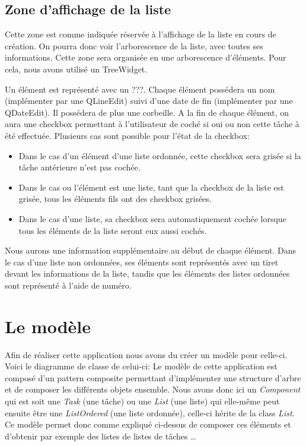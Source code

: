 \documentclass[a4paper,10pt]{article}
\begin{document}
\subsection{Zone d'affichage de la liste}
Cette zone est comme indiquée réservée à l'affichage de la liste en cours de création. On pourra donc voir l'arborescence de la liste, avec toutes ses informations.
Cette zone sera organisée en une arborescence d'éléments. Pour cela, nous avons utilisé un TreeWidget.

Un élément est représenté avec un ???. %
Chaque élément possédera un nom (implémenter par une QLineEdit) suivi d'une date de fin (implémenter par une QDateEdit). Il possédera de plus une corbeille. A la fin de chaque élément, on aura une checkbox permettant à l'utilisateur de coché si oui ou non cette tâche à été effectuée. Plusieurs cas sont possible pour l'état de la checkbox:
\begin{itemize}
\item Dans le cas d'un élément d'une liste ordonnée, cette checkbox sera grisée si la tâche antérieure n'est pas cochée.
\item Dans le cas ou l'élément est une liste, tant que la checkbox de la liste est grisée, tous les éléments fils ont des checkbox grisées.
\item Dans le cas d'une liste, sa checkbox sera automatiquement cochée lorsque tous les éléments de la liste seront eux aussi cochés.
\end{itemize}
Nous aurons une information supplémentaire au début de chaque élément. Dans le cas d'une liste non ordonnées, ses éléments sont représentés avec un tiret devant les informations de la liste, tandis que les éléments des listes ordonnées sont représenté à l'aide de numéro.

\newpage
\section{Le modèle}
Afin de réaliser cette application nous avons du créer un modèle pour celle-ci. Voici le diagramme de classe de celui-ci:
Le modèle de cette application est composé d'un pattern composite permettant d'implémenter une structure d'arbre et de composer les différents objets ensemble. Nous avons donc ici un \textit{Component} qui est soit une \textit{Task} (une tâche) ou une \textit{List} (une liste) qui elle-même peut ensuite être une \textit{ListOrdered} (une liste ordonnée), celle-ci hérite de la class \textit{List}. Ce modèle permet donc comme expliqué ci-dessus de composer ces éléments et d'obtenir par exemple des listes de listes de tâches \dots 
\end{document}
